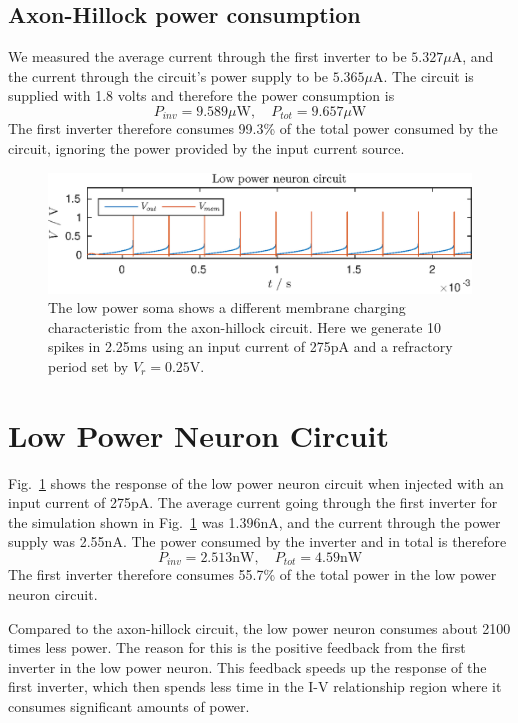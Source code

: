 \subsection{Axon-Hillock power consumption}
We measured the average current through the first inverter to be \(5.327\mu\)A, and the current through the circuit's power supply to be \(5.365\mu\)A. The circuit
is supplied with 1.8 volts and therefore the power consumption is
\begin{equation*}
    P_{inv} = 9.589 \mu\text{W}, \quad  P_{tot} = 9.657 \mu\text{W}
\end{equation*}
The first inverter therefore consumes 99.3\% of the total power consumed by the circuit, ignoring the power provided by the input current source.
\begin{figure}
    \center
    \includegraphics{fig6.eps}
    \caption{The low power soma shows a different membrane charging characteristic from the axon-hillock circuit. Here we generate 10 spikes in 2.25ms 
    using an input current of 275pA and a refractory period set by $V_r=0.25$V.}
    \label{fig:6}
\end{figure}
\section{Low Power Neuron Circuit}
Fig.~\ref{fig:6} shows the response of the low power neuron circuit when injected with an input current of 275pA. The average current going through the
first inverter for the simulation shown in Fig.~\ref{fig:6} was 1.396nA, and the current through the power supply was 2.55nA. The power consumed by the
inverter and in total is therefore
\begin{equation*}
    P_{inv} = 2.513 \text{nW}, \quad  P_{tot} = 4.59 \text{nW}
\end{equation*}
The first inverter therefore consumes 55.7\% of the total power in the low power neuron circuit.

Compared to the axon-hillock circuit, the low power neuron consumes about 2100 times less power.
The reason for this is the positive feedback from the first inverter in the low power neuron. This feedback speeds up the response of the first inverter, which 
then spends less time in the I-V relationship region where it consumes significant amounts of power.

